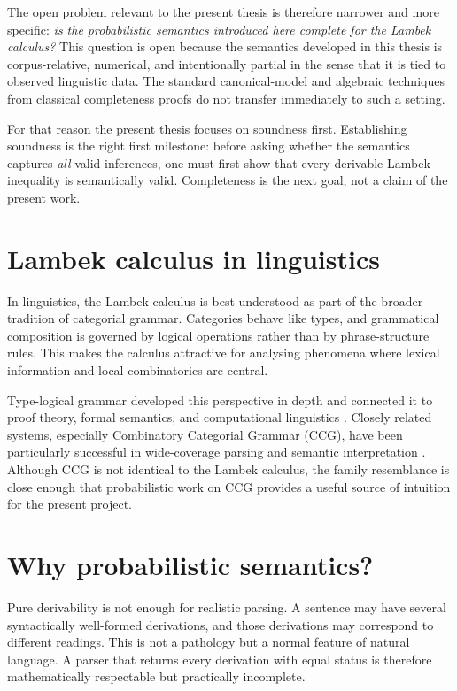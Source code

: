 \documentclass[12pt,a4paper]{report}
\theoremstyle{definition}
\begin{document}
The open problem relevant to the present thesis is therefore narrower and more specific:
\emph{is the probabilistic semantics introduced here complete for the Lambek calculus?} This
question is open because the semantics developed in this thesis is corpus-relative, numerical,
and intentionally partial in the sense that it is tied to observed linguistic data. The standard
canonical-model and algebraic techniques from classical completeness proofs do not transfer
immediately to such a setting.

For that reason the present thesis focuses on soundness first. Establishing soundness is the right
first milestone: before asking whether the semantics captures \emph{all} valid inferences, one
must first show that every derivable Lambek inequality is semantically valid. Completeness is the
next goal, not a claim of the present work.

\section{Lambek calculus in linguistics}
In linguistics, the Lambek calculus is best understood as part of the broader tradition of
categorial grammar. Categories behave like types, and grammatical composition is governed by
logical operations rather than by phrase-structure rules. This makes the calculus attractive for
analysing phenomena where lexical information and local combinatorics are central.

Type-logical grammar developed this perspective in depth and connected it to proof theory,
formal semantics, and computational linguistics \citep{Moortgat1997,Morrill1994}. Closely related
systems, especially Combinatory Categorial Grammar (CCG), have been particularly successful in
wide-coverage parsing and semantic interpretation \citep{Steedman2000,ClarkCurran2007}.
Although CCG is not identical to the Lambek calculus, the family resemblance is close enough
that probabilistic work on CCG provides a useful source of intuition for the present project.

\section{Why probabilistic semantics?}
Pure derivability is not enough for realistic parsing. A sentence may have several syntactically
well-formed derivations, and those derivations may correspond to different readings. This is not a
pathology but a normal feature of natural language. A parser that returns every derivation with
equal status is therefore mathematically respectable but practically incomplete.
\end{document}
